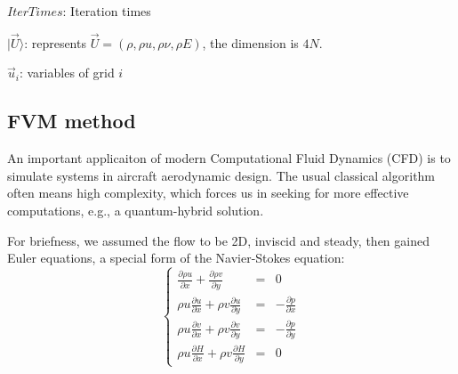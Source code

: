 \documentclass[%
 reprint,
 amsmath,amssymb,
pra,
]{revtex4-1}
\begin{document}
$IterTimes$: Iteration times

$|\vec{U}\rangle$: represents $\vec{U}=(\rho,\rho u, \rho\nu, \rho E)$, the dimension is $4N$. 

$\vec{u}_i$: variables of grid $i$ 

\subsection{FVM method}\label{classicalFVM}

An important applicaiton of modern Computational Fluid Dynamics (CFD) is to simulate systems in aircraft aerodynamic design. The usual classical algorithm often means high complexity, which forces us in seeking for more effective computations, e.g., a quantum-hybrid solution.

For briefness, we assumed the flow to be 2D, inviscid and steady, then gained Euler equations, a special form of the Navier-Stokes equation:
\begin{equation}
\left\{
\begin{array}{ccc}
	\frac{\partial \rho u}{\partial x} + \frac{\partial \rho v}{\partial y} & = & 0\\
	\rho u \frac{\partial u}{\partial x} + \rho v \frac{\partial u}{\partial y} & = & -\frac{\partial p}{\partial x}\\
	\rho u \frac{\partial v}{\partial x} + \rho v \frac{\partial v}{\partial y} & = & -\frac{\partial p}{\partial y}\\
	\rho u \frac{\partial H}{\partial x} + \rho v \frac{\partial H}{\partial y} & = & 0
\end{array}
\right.
\end{equation}
\end{document}
